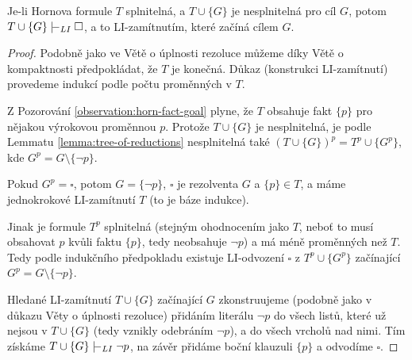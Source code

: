\begin{theorem}\label{theorem:completeness-of-li-resolution-for-horn}
Je-li Hornova formule $T$ splnitelná, a $T\cup\{G\}$ je nesplnitelná pro cíl $G$, potom $T\cup\{G\}\proves_{LI}\square$, a to LI-zamítnutím, které začíná cílem $G$.   
\end{theorem}
\begin{proof}
    Podobně jako ve Větě o úplnosti rezoluce můžeme díky Větě o kompaktnosti předpokládat, že $T$ je konečná. Důkaz (konstrukci LI-zamítnutí) provedeme indukcí podle počtu proměnných v $T$.

    Z Pozorování \ref{observation:horn-fact-goal} plyne, že $T$ obsahuje fakt $\{p\}$ pro nějakou výrokovou proměnnou $p$. Protože $T\cup\{G\}$ je nesplnitelná, je podle Lemmatu \ref{lemma:tree-of-reductions} nesplnitelná také $(T\cup\{G\})^p=T^p\cup\{G^p\}$, kde $G^p=G\setminus\{\neg p\}$.
    
    Pokud $G^p=\square$, potom $G=\{\neg p\}$, $\square$ je rezolventa $G$ a $\{p\}\in T$, a máme jednokrokové LI-zamítnutí $T$ (to je báze indukce). 
    
    Jinak je formule $T^p$ splnitelná (stejným ohodnocením jako $T$, neboť to musí obsahovat $p$ kvůli faktu $\{p\}$, tedy neobsahuje $\neg p$) a má méně proměnných než $T$. Tedy podle indukčního předpokladu existuje LI-odvození $\square$ z $T^p\cup\{G^p\}$ začínající $G^p=G\setminus\{\neg p\}$.

    Hledané LI-zamítnutí $T\cup\{G\}$ začínající $G$ zkonstruujeme (podobně jako v důkazu Věty o úplnosti rezoluce) přidáním literálu $\neg p$ do všech listů, které už nejsou v $T\cup\{G\}$ (tedy vznikly odebráním $\neg p$), a do všech vrcholů nad nimi. Tím získáme $T\cup\{G\}\proves_{LI}\neg p$, na závěr přidáme boční klauzuli $\{p\}$ a odvodíme $\square$.
\end{proof}

